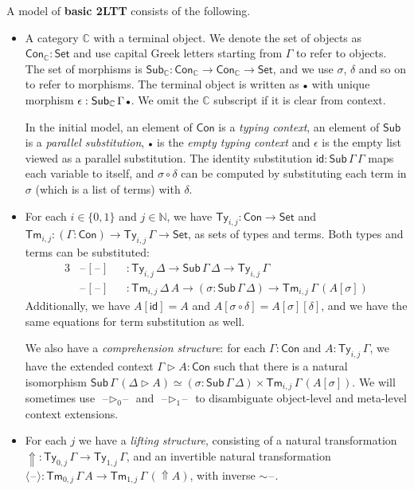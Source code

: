 \documentclass[acmsmall,screen]{acmart}
\newcommand{\msf}[1]{\mathsf{#1}}
\newcommand{\mbb}[1]{\mathbb{#1}}
\newcommand{\ext}{\triangleright}
\newcommand{\Lift}{{\Uparrow}}
\newcommand{\spl}{{\sim}}
\newcommand{\qut}[1]{\langle #1\rangle}
\newcommand{\mbbc}{\mbb{C}}
\newcommand{\Con}{\msf{Con}}
\newcommand{\Sub}{\msf{Sub}}
\newcommand{\Ty}{\msf{Ty}}
\newcommand{\Tm}{\msf{Tm}}
\newcommand{\emptycon}{\scaleobj{.75}\bullet}
\newcommand{\id}{\msf{id}}
\newcommand{\Set}{\mathsf{Set}}
\newcommand{\blank}{{\mathord{\hspace{1pt}\text{--}\hspace{1pt}}}}
\theoremstyle{remark}
\begin{document}
\begin{definition} A model of \textbf{basic 2LTT} consists of the following.
\begin{itemize}
\item
  A category $\mbbc$ with a terminal object. We denote the set of objects as
  $\Con_{\mbbc} : \Set$ and use capital Greek letters starting from $\Gamma$ to
  refer to objects. The set of morphisms is $\Sub_{\mbbc} : \Con_{\mbbc} \to
  \Con_{\mbbc} \to \Set$, and we use $\sigma$, $\delta$ and so on to refer to
  morphisms. The terminal object is written as $\emptycon$ with unique morphism
  $\epsilon : \Sub_\mbbc\,\Gamma\,\emptycon$. We omit the $\mbbc$ subscript if
  it is clear from context.

  In the initial model, an element of $\Con$ is a \emph{typing context}, an
  element of $\Sub$ is a \emph{parallel substitution}, $\emptycon$ is the
  \emph{empty typing context} and $\epsilon$ is the empty list viewed as a
  parallel substitution. The identity substitution $\id : \Sub\,\Gamma\,\Gamma$
  maps each variable to itself, and $\sigma \circ \delta$ can be computed
  by substituting each term in $\sigma$ (which is a list of terms) with $\delta$.
\item
  For each $i \in \{0,1\}$ and $j \in \mbb{N}$, we have $\Ty_{i,j} : \Con \to
  \Set$ and $\Tm_{i,j} : (\Gamma : \Con) \to \Ty_{i,j}\,\Gamma \to \Set$, as
  sets of types and terms. Both types and terms can be substituted:
  \begin{alignat*}{3}
    & \blank\![\blank\!] &&: \Ty_{i,j}\,\Delta \to \Sub\,\Gamma\,\Delta \to \Ty_{i,j}\,\Gamma \\
    & \blank\![\blank\!] &&: \Tm_{i,j}\,\Delta\,A \to (\sigma : \Sub\,\Gamma\,\Delta) \to \Tm_{i,j}\,\Gamma\,(A[\sigma])
  \end{alignat*}
  Additionally, we have $A[\id] = A$ and $A[\sigma \circ \delta] =
  A[\sigma][\delta]$, and we have the same equations for term substitution as
  well.

  We also have a \emph{comprehension structure}: for each $\Gamma : \Con$
  and $A : \Ty_{i,j}\,\Gamma$, we have the extended context $\Gamma \ext A :
  \Con$ such that there is a natural isomorphism $\Sub\,\Gamma\,(\Delta\ext A)
  \simeq (\sigma : \Sub\,\Gamma\,\Delta) \times
  \Tm_{i,j}\,\Gamma\,(A[\sigma])$. We will sometimes use
  $\blank\!\ext_0\!\blank$ and $\blank\!\ext_1\!\blank$ to disambiguate
  object-level and meta-level context extensions.
\item
  For each $j$ we have a \emph{lifting structure}, consisting of a natural
  transformation $\Lift : \Ty_{0,j}\,\Gamma \to \Ty_{1,j}\,\Gamma$, and an
  invertible natural transformation $\qut{\blank} : \Tm_{0,j}\,\Gamma\,A \to
  \Tm_{1,j}\,\Gamma\,(\Lift A)$, with inverse $\spl\blank$.
\end{itemize}
\end{definition}
\end{document}
